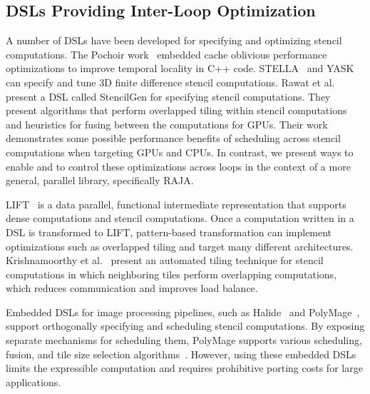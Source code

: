 
\subsection{DSLs Providing Inter-Loop Optimization}
A number of DSLs have been developed for specifying and
optimizing stencil computations.
The Pochoir work~\cite{Tang2011} embedded cache oblivious performance
optimizations to improve temporal locality in C++ code.
STELLA~\cite{Gysi2015}  and YASK~\cite{YASK2016} can specify and 
tune 3D finite difference stencil computations.
Rawat et al.~\cite{Rawat18} present a DSL called StencilGen for specifying
stencil computations.
They present algorithms that perform overlapped tiling within stencil
computations and heuristics for fusing between the computations for GPUs.
Their work demonstrates some possible performance benefits of scheduling
across stencil computations when targeting GPUs and CPUs. In contrast,
we present ways to enable and to control these optimizations across loops
in the context of a more general, parallel library, specifically RAJA.

LIFT~\cite{Hagedorn2018} is a data parallel, functional intermediate
representation that supports dense computations and stencil computations.
Once a computation written in a DSL is transformed to LIFT, pattern-based
transformation can implement optimizations such as overlapped tiling and
target many different architectures.
Krishnamoorthy et al.~\cite{Krishnamoorthy07} present an automated tiling
technique for stencil computations in which neighboring tiles perform
overlapping computations, which reduces communication and improves load
balance.

Embedded DSLs for image processing pipelines, such as
Halide~\cite{Ragan-Kelley2012,Ragan-Kelley2013} and
PolyMage~\cite{Mullapudi2015}, support orthogonally specifying and
scheduling stencil computations.
By exposing separate mechanisms for scheduling them, PolyMage supports
various scheduling, fusion, and tile size selection
algorithms~\cite{Mullapudi2016,Jangda2018,Adams2019}.
However, using these embedded DSLs limits the expressible computation and requires prohibitive porting costs for large applications.

